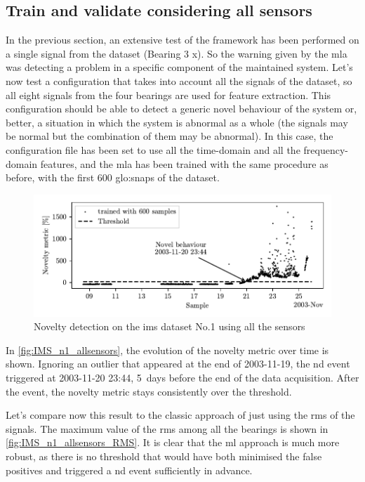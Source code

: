 \subsection{Train and validate considering all sensors}
In the previous section, an extensive test of the framework has been performed on a single signal from the dataset (Bearing 3 x). So the warning given by the \gls{mla} was detecting a problem in a specific component of the maintained system. Let's now test a configuration that takes into account all the signals of the dataset, so all eight signals from the four bearings are used for feature extraction. This configuration should be able to detect a generic novel behaviour of the system or, better, a situation in which the system is abnormal as a whole (the signals may be normal but the combination of them may be abnormal).  In this case, the configuration file has been set to use all the time-domain and all the frequency-domain features, and the \gls{mla} has been trained with the same procedure as before, with the first 600 \gls{glo:snap}s of the dataset. 


\begin{figure}
    \centering
    \includegraphics{images/IMS/Novelty_01_500samples_allsensors.pdf}
    \caption{Novelty detection on the \gls{ims} dataset No.1 using all the sensors}
    \label{fig:IMS_n1_allsensors}
\end{figure}

In \autoref{fig:IMS_n1_allsensors}, the evolution of the novelty metric over time is shown. Ignoring an outlier that appeared at the end of 2003-11-19, the \gls{nd} event triggered at 2003-11-20 23:44, 5~days before the end of the data acquisition. After the event, the novelty metric stays consistently over the threshold.

Let's compare now this result to the classic approach of just using the \gls{rms} of the signals. The maximum value of the \gls{rms} among all the bearings is shown in \autoref{fig:IMS_n1_allsensors_RMS}. It is clear that the \gls{ml} approach is much more robust, as there is no threshold that would have both minimised the false positives and triggered a \gls{nd} event sufficiently in advance.

